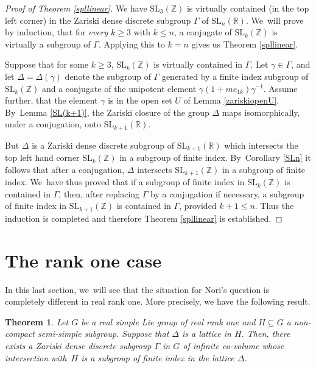 \documentclass[JEP,XML,SOM,Unicode,published]{cedram}
\newtheorem{theorem}{Theorem}
\theoremstyle{definition}
\newcommand{\field}[1]{\mathbb{#1}}
\newcommand{\R}{\field{R}}
\newcommand{\Z}{\field{Z}}
\newcommand{\SL}{\mathrm{SL}}
\let\D\Delta
\begin{document}
\begin{proof}[Proof of Theorem \ref{spllinear}] We have
$\SL_3(\Z)$ is virtually contained (in the top left corner) in the
Zariski dense discrete subgroup $\Gamma $ of $\SL_n(\R)$. We~will
prove by induction, that for \emph{every} $k\geq 3$ with $k\leq n$, a
conjugate of $\SL_k(\Z)$ is virtually a subgroup of $\Gamma$.
Applying this to $k=n$ gives us Theorem \ref{spllinear}.

Suppose that for some $k \geq 3$, $\SL_k(\Z)$ is virtually contained
in $\Gamma$. Let $\gamma\in \Gamma$, and let $\Delta =\Delta (\gamma)$
denote the subgroup of $\Gamma $ generated by a finite index subgroup of $\SL_k(\Z)$ and a
conjugate of the unipotent element $\gamma(1+me_{1k})\gamma ^{-1}$.
Assume further, that the element $\gamma $ is in the open set
$U$ of Lemma \ref{zariskiopenU}. By~Lemma \ref{SL(k+1)},
the Zariski closure of the group $\Delta $ maps isomorphically, under a conjugation, onto $\SL_{k+1}(\R)$.

But $\D$ is a Zariski dense discrete subgroup of $\SL_{k+1}(\R)$ which intersects the top left hand corner $\SL_k(\Z)$ in a subgroup of finite index. By~Corollary \ref{SLn} it follows that after a conjugation, $\D$ intersects $\SL_{k+1}(\Z)$ in a subgroup of finite index. We~have thus
proved that if a subgroup of finite index in $\SL_{k} (\Z)$ is contained in $\Gamma $, then, after replacing $\Gamma$ by a conjugation if necessary, a subgroup of finite index in $\SL_{k+1}(\Z)$ is contained in $\Gamma $, provided $k+1\leq n$. Thus the induction is completed and
therefore Theorem \ref{spllinear} is established.
\end{proof}

\section{The rank one case}

In this last section, we~will see that the situation for Nori's
question is completely different in real rank one. More precisely, we
have the following result.

\begin{theorem}\label{rankone} Let $G$ be a real simple Lie group of
real rank one and $H\subseteq G$ a non-compact semi-simple subgroup.
Suppose that $\Delta $ is a lattice in $H$. Then, there exists a
Zariski dense discrete subgroup $\Gamma $ in $G$ of infinite co-volume
whose intersection with~$H$ is a subgroup of finite index in the
lattice $\Delta$.
\end{theorem}
\end{document}
